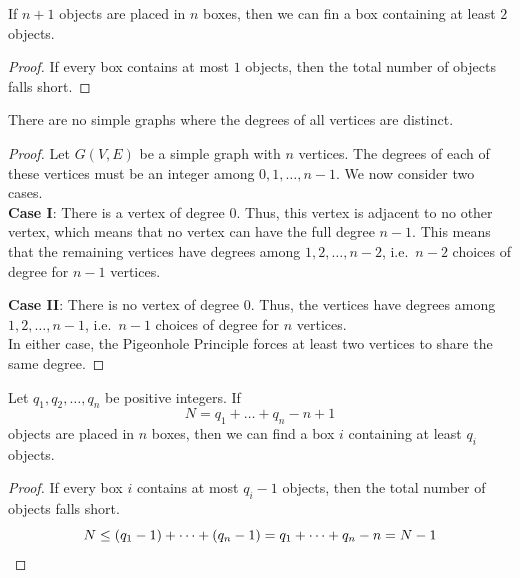 \documentclass[11pt]{article}
\theoremstyle{definition}
\theoremstyle{remark}
\numberwithin{equation}{section}
\begin{document}
    \begin{lemma}
        If $n + 1$ objects are placed in $n$ boxes, then we can fin a box containing
        at least $2$ objects.
    \end{lemma}
    \begin{proof}
        If every box contains at most $1$ objects, then the total number of objects
        falls short.
    \end{proof}

    \begin{theorem}
        There are no simple graphs where the degrees of all vertices are distinct.
    \end{theorem}
    \begin{proof}
        Let $G(V, E)$ be a simple graph with $n$ vertices. The degrees of each of
        these vertices must be an integer among $0, 1, \dots, n - 1$. We now consider
        two cases. \\

        \textbf{Case I}: There is a vertex of degree $0$. Thus, this vertex is
        adjacent to no other vertex, which means that no vertex can have the full
        degree $n - 1$. This means that the remaining vertices have degrees among $1,
        2, \dots, n - 2$, i.e.\ $n - 2$ choices of degree for $n - 1$ vertices.

        \textbf{Case II}: There is no vertex of degree $0$. Thus, the vertices have
        degrees among $1, 2, \dots, n - 1$, i.e.\ $n - 1$ choices of degree for $n$
        vertices. \\

        In either case, the Pigeonhole Principle forces at least two vertices to
        share the same degree.
    \end{proof}

    \begin{lemma}
        Let $q_1, q_2, \dots, q_n$ be positive integers. If \[
            N = q_1 + \dots + q_n - n + 1
        \] objects are placed in $n$ boxes, then we can find a box $i$ containing at
        least $q_i$ objects.
    \end{lemma}
    \begin{proof}
        If every box $i$ contains at most $q_i - 1$ objects, then the total number of
        objects falls short. \[
            N \leq (q_1 - 1) + \dots + (q_n - 1) = q_1 + \dots + q_n - n = N - 1 \qedhere
        \] 
    \end{proof}
\end{document}
